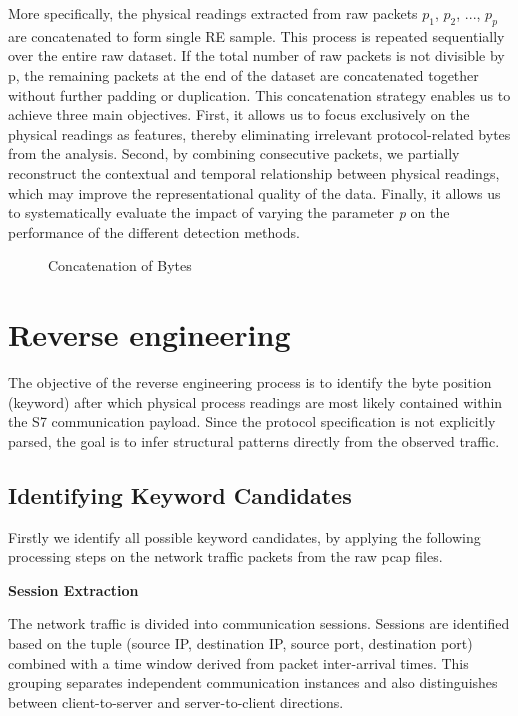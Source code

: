 More specifically, the physical readings extracted from raw packets $p_1$, $p_2$, ..., $p_p$ are concatenated to form single \ac{RE} sample. This process is repeated sequentially over the entire raw dataset. If the total number of raw packets is not divisible by p, the remaining packets at the end of the dataset are concatenated together without further padding or duplication. This concatenation strategy enables us to achieve three main objectives. First, it allows us to focus exclusively on the physical readings as features, thereby eliminating irrelevant protocol-related bytes from the analysis. Second, by combining consecutive packets, we partially reconstruct the contextual and temporal relationship between physical readings, which may improve the representational quality of the data. Finally, it allows us to systematically evaluate the impact of varying the parameter \textit{p} on the performance of the different detection methods. 



\begin{figure}[h]
    \centering
    
    \caption{Concatenation of Bytes}
    \label{fig:ConcatenationOfBytes}
\end{figure}



\section{Reverse engineering}
\label{sec:rev-eng}
The objective of the reverse engineering process is to identify the
byte position (keyword) after which physical process readings are most
likely contained within the S7 communication payload. Since the protocol
specification is not explicitly parsed, the goal is to infer structural
patterns directly from the observed traffic.

\subsection{Identifying Keyword Candidates}

Firstly we identify all possible keyword candidates, by applying the following processing steps on the network traffic packets from the raw pcap files. 

\textbf{Session Extraction}

The network traffic is divided into communication sessions.
Sessions are identified based on the tuple
(source \ac{IP}, destination \ac{IP}, source port, destination port)
combined with a time window derived from packet inter-arrival times.
This grouping separates independent communication instances and
also distinguishes between client-to-server and server-to-client
directions.

